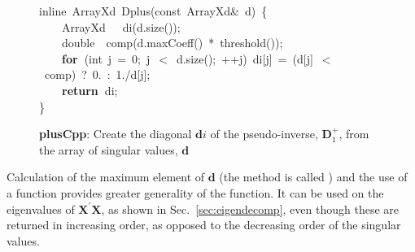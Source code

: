 \documentclass[shortnames,article]{jss}
\newcommand{\hlstd}[1]{\textcolor[rgb]{0,0,0}{#1}}
\newcommand{\hlnum}[1]{\textcolor[rgb]{0,0,0}{#1}}
\newcommand{\hlopt}[1]{\textcolor[rgb]{0,0,0}{#1}}
\newcommand{\hlkwa}[1]{\textcolor[rgb]{0.61,0.13,0.93}{\bf{#1}}}
\newcommand{\hlkwb}[1]{\textcolor[rgb]{0.13,0.54,0.13}{#1}}
\newcommand{\hlkwc}[1]{\textcolor[rgb]{0,0,1}{#1}}
\newcommand{\hlkwd}[1]{\textcolor[rgb]{0,0,0}{#1}}
\begin{document}
\begin{figure}[htb]
  \noindent
  \ttfamily
  \hlstd{}\hlkwc{inline\ }\hlstd{ArrayXd\ }\hlkwd{Dplus}\hlstd{}\hlopt{(}\hlstd{}\hlkwb{const\ }\hlstd{ArrayXd}\hlopt{\&\ }\hlstd{d}\hlopt{)\ \{}\hspace*{\fill}\\
  \hlstd{}\hlstd{\ \ \ \ }\hlstd{ArrayXd}\hlstd{\ \ \ }\hlstd{}\hlkwd{di}\hlstd{}\hlopt{(}\hlstd{d}\hlopt{.}\hlstd{}\hlkwd{size}\hlstd{}\hlopt{());}\hspace*{\fill}\\
  \hlstd{}\hlstd{\ \ \ \ }\hlstd{}\hlkwb{double}\hlstd{\ \ }\hlkwb{}\hlstd{}\hlkwd{comp}\hlstd{}\hlopt{(}\hlstd{d}\hlopt{.}\hlstd{}\hlkwd{maxCoeff}\hlstd{}\hlopt{()\ {*}\ }\hlstd{}\hlkwd{threshold}\hlstd{}\hlopt{());}\hspace*{\fill}\\
  \hlstd{}\hlstd{\ \ \ \ }\hlstd{}\hlkwa{for\ }\hlstd{}\hlopt{(}\hlstd{}\hlkwb{int\ }\hlstd{j\ }\hlopt{=\ }\hlstd{}\hlnum{0}\hlstd{}\hlopt{;\ }\hlstd{j\ }\hlopt{$<$\ }\hlstd{d}\hlopt{.}\hlstd{}\hlkwd{size}\hlstd{}\hlopt{();\ ++}\hlstd{j}\hlopt{)\ }\hlstd{di}\hlopt{{[}}\hlstd{j}\hlopt{{]}\ =\ (}\hlstd{d}\hlopt{{[}}\hlstd{j}\hlopt{{]}\ $<$\ }\hlstd{comp}\hlopt{)\ }\hlstd{?\ }\hlnum{0}\hlstd{}\hlopt{.\ :\ }\hlstd{}\hlnum{1}\hlstd{}\hlopt{./}\hlstd{d}\hlopt{{[}}\hlstd{j}\hlopt{{]};}\hspace*{\fill}\\
  \hlstd{}\hlstd{\ \ \ \ }\hlstd{}\hlkwa{return\ }\hlstd{di}\hlopt{;}\hspace*{\fill}\\
  \hlstd{}\hlopt{\}}\hlstd{}\hspace*{\fill}\\
  \mbox{}
  \normalfont
  \normalsize
  \caption{\textbf{plusCpp}: Create the diagonal $\bm di$ of the pseudo-inverse, $\bm D_1^+$, from the array of singular values, $\bm d$}
  \label{Dplus}
\end{figure}

Calculation of the maximum element of $\bm d$ (the method is called
) and the use of a  function
provides greater generality of the function.  It can be used on the
eigenvalues of $\bm X^\prime\bm X$, as shown in
Sec.~\ref{sec:eigendecomp}, even though these are returned in
increasing order, as opposed to the decreasing order of the singular
values.
\end{document}
